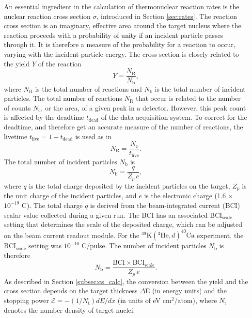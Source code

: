 An essential ingredient in the calculation of thermonuclear reaction rates is the nuclear reaction cross section $\sigma$, introduced in Section \ref{sec:rates}. The reaction cross section is an imaginary, effective area around the target nucleus where the reaction proceeds with a probability of unity if an incident particle passes through it. It is therefore a measure of the probability for a reaction to occur, varying with the incident particle energy. The cross section is closely related to the yield $Y$ of the reaction
\begin{equation}
Y = \frac{N_{\mathrm{R}}}{N_{\mathrm{b}}},
\end{equation}
where $N_{\mathrm{R}}$ is the total number of reactions and $N_{\mathrm{b}}$ is the total number of incident particles. The total number of reactions $N_{\mathrm{R}}$ that occur is related to the number of counts $N_{\mathrm{c}}$, or the area, of a given peak in a detector. However, this peak count is affected by the deadtime $t_{\mathrm{dead}}$ of the data acquisition system. To correct for the deadtime, and therefore get an accurate measure of the number of reactions, the livetime $t_{\mathrm{live}} = 1 - t_{\mathrm{dead}}$ is used as in
\begin{equation}
N_{\mathrm{R}} = \frac{N_{\mathrm{c}}}{t_{\mathrm{live}}}.
\end{equation}
The total number of incident particles $N_{\mathrm{b}}$ is
\begin{equation}
N_{\mathrm{b}} = \frac{q}{Z_{p} \, e},
\end{equation}
where $q$ is the total charge deposited by the incident particles on the target, $Z_{p}$ is the unit charge of the incident particles, and $e$ is the electronic charge (1.6 $\times$ $10^{-19}$ C). The total charge $q$ is derived from the beam-integrated current (BCI) scalar value collected during a given run. The BCI has an associated $\mathrm{BCI}_{\mathrm{scale}}$ setting that determines the scale of the deposited charge, which can be adjusted on the beam current readout module. For the $^{39}\mathrm{K}(^{3}\mathrm{He},d)^{40}\mathrm{Ca}$ experiment, the $\mathrm{BCI}_{\mathrm{scale}}$ setting was $10^{-10}$ C/pulse. The number of incident particles $N_{\mathrm{b}}$ is therefore
\begin{equation}
N_{\mathrm{b}} = \frac{\mathrm{BCI} \times \mathrm{BCI_{\mathrm{scale}}}}{Z_{p} \, e}.
\end{equation}
As described in Section \ref{subsec:cs_calc}, the conversion between the yield and the cross section depends on the target thickness $\Delta$E (in energy units) and the stopping power $\mathcal{E} = -(1/N_{\mathrm{t}})dE/dx$ (in units of eV $\mathrm{cm}^{2} / \mathrm{atom}$), where $N_{\mathrm{t}}$ denotes the number density of target nuclei.

